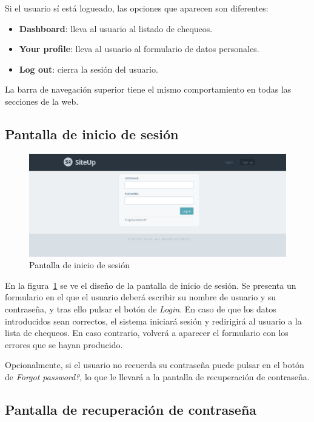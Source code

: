 Si el usuario sí está logueado, las opciones que aparecen son diferentes:

\begin{itemize}
\item \textbf{Dashboard}: lleva al usuario al listado de chequeos.
\item \textbf{Your profile}: lleva al usuario al formulario de datos personales.
\item \textbf{Log out}: cierra la sesión del usuario.
\end{itemize}

La barra de navegación superior tiene el mismo comportamiento en todas las
secciones de la web.


\subsection{Pantalla de inicio de sesión}

\begin{figure}[htbp]
  \centering
  \includegraphics[width=\textwidth]{5_diseno/web-login.png}
  \caption{Pantalla de inicio de sesión}
  \label{fig:web-login}
\end{figure}

En la figura~\ref{fig:web-login} se ve el diseño de la pantalla de inicio de
sesión. Se presenta un formulario en el que el usuario deberá escribir su nombre
de usuario y su contraseña, y tras ello pulsar el botón de \textit{Login}. En
caso de que los datos introducidos sean correctos, el sistema iniciará sesión y
redirigirá al usuario a la lista de chequeos. En caso contrario, volverá a
aparecer el formulario con los errores que se hayan producido.

Opcionalmente, si el usuario no recuerda su contraseña puede pulsar en el botón
de \textit{Forgot password?}, lo que le llevará a la pantalla de recuperación de
contraseña.

\subsection{Pantalla de recuperación de contraseña}

